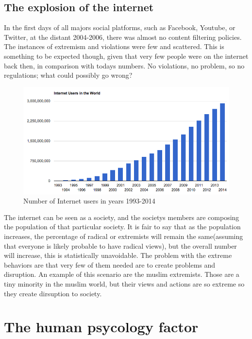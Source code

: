 \documentclass[openany]{article}
\begin{document}
	\subsection*{The explosion of the internet}
		In the first days of all majors social platforms, such as Facebook, Youtube, or Twitter, at the distant 2004-2006, there was almost no content 
		filtering policies. The instances of extremism and violations were few and scattered. This is something to be expected though, given that very 
		few people were on the internet back then, in comparison with todays numbers. No violations, no problem, so no regulations; what could possibly 
		go wrong?
	\begin{figure}[H]
		\iftrue
		\caption{Number of Internet users in years 1993-2014}
		\centering
		\includegraphics[scale=0.3]{res/users}
		\fi
	\end{figure}
		The internet can be seen as a society, and the societys members are composing the population of that particular society. It is fair 
		to say that as the population increases, the percentage of radical or extremists will remain the same(assuming that everyone is 
		likely probable to have radical views), but the overall number will increase, this is statistically unavoidable. The problem 
		with the extreme behaviors are that very few of them needed are to create problems and disruption. An example of this scenario are the 
		muslim extremists. Those are a tiny minority in the muslim world, but their views and actions are so extreme so they create 
		dirsuption to society.
	\section{The human psycology factor}
\end{document}

